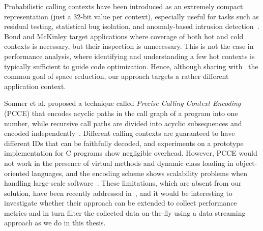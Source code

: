 Probabilistic calling contexts have been introduced as an extremely compact representation (just a 32-bit value per context), especially useful for tasks such as residual testing, statistical bug isolation, and anomaly-based intrusion detection~\cite{Bond07}. Bond and McKinley target applications where coverage of both hot and cold contexts is necessary, but their inspection is unnecessary. This is not the case in performance analysis, where identifying and understanding a few hot contexts is typically sufficient to guide code optimization. Hence, although sharing with~\cite{Bond07} the common goal of space reduction, our approach targets a rather different application context.

Somner et al. proposed a technique called {\em Precise Calling Context Encoding} (PCCE) that encodes acyclic paths in the call graph of a program into one number, while recursive call paths are divided into acyclic subsequences and encoded independently~\cite{Sumner10,Sumner12}. Different calling contexts are guaranteed to have different IDs that can be faithfully decoded, and experiments on a prototype implementation for C programs show negligible overhead. However, PCCE would not work in the presence of virtual methods and dynamic class loading in object-oriented languages, and the encoding scheme shows scalability problems when handling large-scale software~\cite{Bond10,Zeng14}. These limitations, which are absent from our solution, have been recently addressed in~\cite{Zeng14}, and it would be interesting to investigate whether their approach can be extended to collect performance metrics and in turn filter the collected data on-the-fly using a data streaming approach as we do in this thesis.


